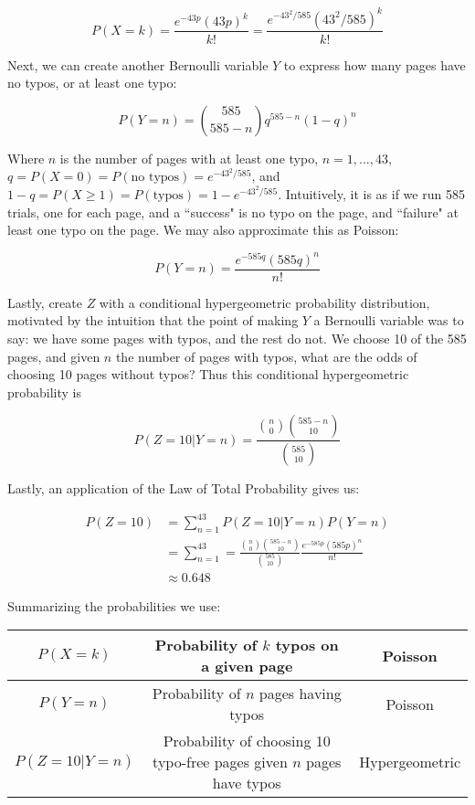 \documentclass[10pt, oneside]{article}   	%
\theoremstyle{definition}
\begin{document}
\begin{enumerate}[label=8.\arabic*]
\[ P(X = k) = \frac{e^{-43p} (43p)^k}{k!} = \frac{e^{-43^2/585} (43^2/585)^k}{k!} \]

Next, we can create another Bernoulli variable $Y$ to express how many pages have no typos, or at least one typo:

\[ P(Y = n) = \binom{585}{585-n} q^{585-n} (1-q)^n \]

Where $n$ is the number of pages with at least one typo, $n = 1, ..., 43$, $q = P(X = 0) = P(\text{no typos}) = e^{-43^2/585}$, and $1 - q = P(X \geq 1) = P(\text{typos}) = 1 - e^{-43^2/585}$. Intuitively, it is as if we run 585 trials, one for each page, and a ``success" is no typo on the page, and ``failure" at least one typo on the page. We may also approximate this as Poisson:

\[ P(Y = n) = \frac{e^{-585q} (585q)^n}{n!} \]

Lastly, create $Z$ with a conditional hypergeometric probability distribution, motivated by the intuition that the point of making $Y$ a Bernoulli variable was to say: we have some pages with typos, and the rest do not. We choose 10 of the 585 pages, and given $n$ the number of pages with typos, what are the odds of choosing 10 pages without typos? Thus this conditional hypergeometric probability is

\[ P(Z = 10 | Y = n) = \frac{ \binom{n}{0} \binom{585-n}{10} }{ \binom{585}{10} } \]

Lastly, an application of the Law of Total Probability gives us:

\begin{align*}
P(Z = 10) &= \sum^{43}_{n=1} P(Z = 10 | Y = n) P(Y = n) \\
&= \sum^{43}_{n=1} = \frac{ \binom{n}{0} \binom{585-n}{10} }{ \binom{585}{10} } \frac{e^{-585p} (585p)^n}{n!} \\
&\approx \boxed{0.648}
\end{align*}

Summarizing the probabilities we use:

\bgroup
\def\arraystretch{2.5}
\begin{tabular}{ |c|c|c| } 
 \hline
 $P(X = k)$ & Probability of $k$ typos on a given page & Poisson  \\ 
 \hline
 $P(Y = n)$ & Probability of $n$ pages having typos & Poisson  \\ 
 \hline
 $P(Z = 10 | Y = n)$ & Probability of choosing 10 typo-free pages given $n$ pages have typos & Hypergeometric  \\ 
 \hline
\end{tabular}
\egroup


\end{enumerate}
\end{document}
